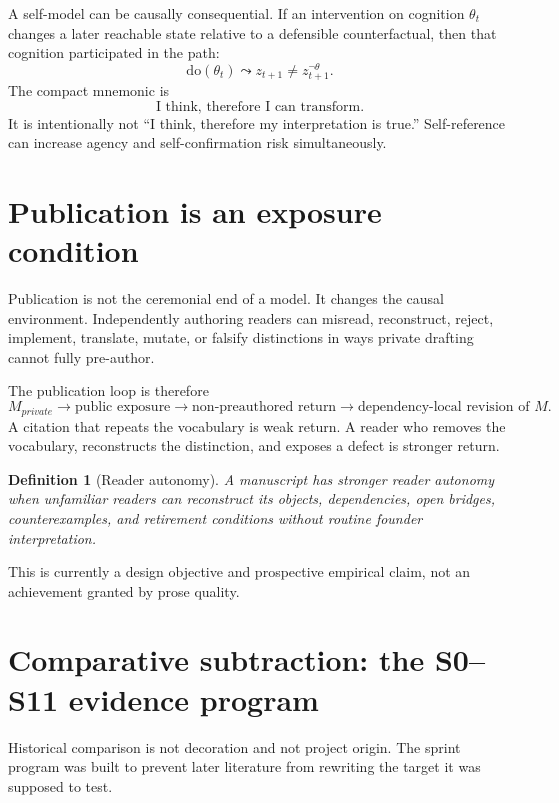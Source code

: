 \documentclass[11pt]{article}
\newtheorem{definition}{Definition}
\begin{document}
A self-model can be causally consequential. If an intervention on cognition $\theta_t$ changes a later reachable state relative to a defensible counterfactual, then that cognition participated in the path:
\begin{equation}
\mathrm{do}(\theta_t)\leadsto z_{t+1}\neq z_{t+1}^{\neg\theta}.
\end{equation}
The compact mnemonic is
\begin{equation}
\boxed{\text{I think, therefore I can transform.}}
\end{equation}
It is intentionally not ``I think, therefore my interpretation is true.'' Self-reference can increase agency and self-confirmation risk simultaneously.

\section{Publication is an exposure condition}

Publication is not the ceremonial end of a model. It changes the causal environment. Independently authoring readers can misread, reconstruct, reject, implement, translate, mutate, or falsify distinctions in ways private drafting cannot fully pre-author.

The publication loop is therefore
\begin{equation}
M_{private}\rightarrow\text{public exposure}\rightarrow\text{non-preauthored return}
\rightarrow\text{dependency-local revision of }M.
\end{equation}
A citation that repeats the vocabulary is weak return. A reader who removes the vocabulary, reconstructs the distinction, and exposes a defect is stronger return.

\begin{definition}[Reader autonomy]
A manuscript has stronger reader autonomy when unfamiliar readers can reconstruct its objects, dependencies, open bridges, counterexamples, and retirement conditions without routine founder interpretation.
\end{definition}
This is currently a design objective and prospective empirical claim, not an achievement granted by prose quality.


\section{Comparative subtraction: the S0--S11 evidence program}
\label{sec:sprints-comparative}

Historical comparison is not decoration and not project origin. The sprint program was built to prevent later literature from rewriting the target it was supposed to test.
\end{document}
